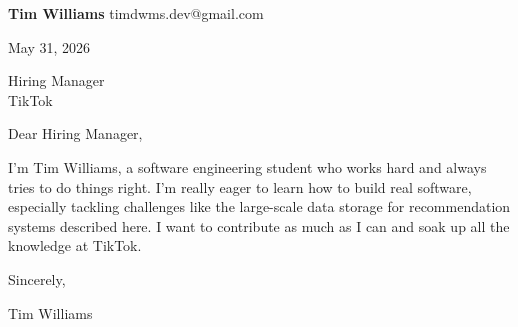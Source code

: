 \documentclass[12pt]{article}
\begin{document}
\textbf{Tim Williams} \hfill timdwms.dev@gmail.com

\vspace{1em}

May 31, 2026

\vspace{1em}

Hiring Manager \\
TikTok

\vspace{1em}

Dear Hiring Manager,

I’m Tim Williams, a software engineering student who works hard and always tries to do things right. I'm really eager to learn how to build real software, especially tackling challenges like the large-scale data storage for recommendation systems described here. I want to contribute as much as I can and soak up all the knowledge at TikTok.

\vspace{1em}

Sincerely,

\vspace{2em}

Tim Williams
\end{document}
